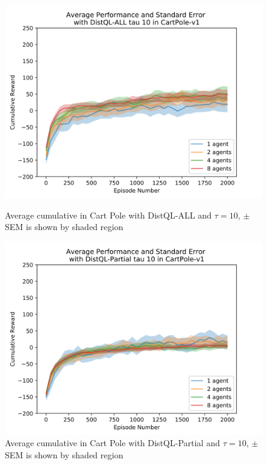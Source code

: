 \documentclass[jair,twoside,11pt,theapa]{article}
\begin{document}
\begin{figure}[h]
	\centering
	\begin{minipage}{.4\textwidth}
		\centering
		\includegraphics[width=1\linewidth]{resultImages/binned-Average-Performance-and-Standard-Error-with-DistQL-ALL-tau-10-in-CartPole-v1}
		\caption{Average cumulative in Cart Pole with DistQL-ALL and $\tau=10$, $\pm$ SEM is shown by shaded region}
		\label{fig:DistQL-ALL-tau-10-env-CartPole}
	\end{minipage}
	\begin{minipage}{.4\textwidth}
		\centering
		\includegraphics[width=1\linewidth]{resultImages/binned-Average-Performance-and-Standard-Error-with-DistQL-Partial-tau-10-in-CartPole-v1}
		\caption{Average cumulative in Cart Pole with DistQL-Partial and $\tau=10$, $\pm$ SEM is shown by shaded region}
		\label{fig:DistQL-Partial-tau-10-env-CartPole}
	\end{minipage}
\end{figure}
\end{document}
